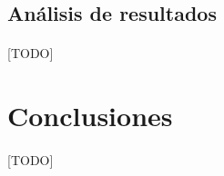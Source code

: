 \documentclass{subfiles}
\begin{document}
      \subsection{Análisis de resultados}
      \label{sec:results_analysis}

        \paragraph{}
        [TODO]

    \section{Conclusiones}
    \label{sec:implementation_results_conclusions}

      \paragraph{}
      [TODO]
\end{document}
